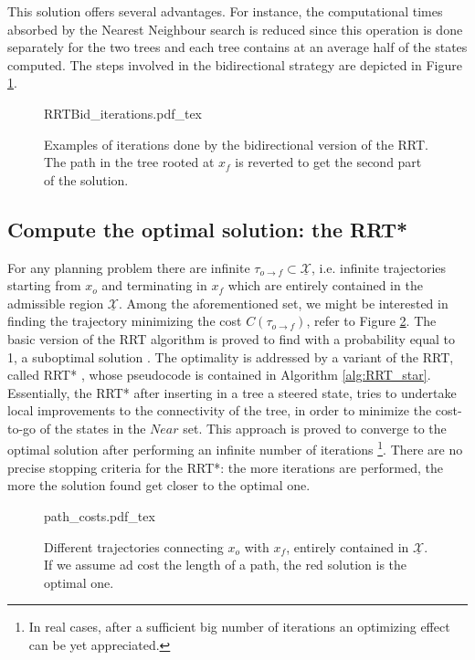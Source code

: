  This solution offers several advantages. For instance, the computational times absorbed by the Nearest Neighbour search is reduced since this operation is done separately for the two trees and each tree contains at an average half of the states computed. The steps involved in the bidirectional strategy are depicted in Figure \ref{fig:RRTBid_single}.

 \begin{figure}
	 \centering
 \def\svgwidth{0.85 \columnwidth}
 {RRTBid_iterations.pdf_tex} 
	 \caption{Examples of iterations done by the bidirectional version of the RRT. The path in the tree rooted at $x_f$ is reverted to get the second part of the solution.}
 \label{fig:RRTBid_single}
 \end{figure}
 

\subsection{Compute the optimal solution: the RRT*}
\label{sec:RRT_star}

For any planning problem there are infinite $\tau_{o \rightarrow f} \subset \underline{ \mathcal{X} }$, i.e. infinite trajectories starting from $x_o$ and terminating in $x_f$ which are entirely contained in the admissible region $\underline{ \mathcal{X} }$. Among the aforementioned set, we might be interested in finding the trajectory minimizing the cost $C(\tau_{o \rightarrow f})$, refer to Figure \ref{fig:path_costs}.
The basic version of the RRT algorithm is proved to find with a probability equal to 1, a suboptimal solution \cite{RRT_star}.
The optimality is addressed by a variant of the RRT, called RRT* \cite{RRT_star}, whose pseudocode is contained in Algorithm \ref{alg:RRT_star}.
Essentially, the RRT* after inserting in a tree a steered state, tries to undertake local improvements to the connectivity of the tree, in order to minimize the cost-to-go of the states in the $Near$ set. This approach is proved to converge to the optimal solution after performing an infinite number of iterations \footnote{In real cases, after a sufficient big number of iterations an optimizing effect can be yet appreciated. }. 
There are no precise stopping criteria for the RRT*: the more iterations are performed, the more the solution found get closer to the optimal one.

 \begin{figure}
	 \centering
 \def\svgwidth{0.4 \columnwidth}
 {path_costs.pdf_tex} 
	 \caption{Different trajectories connecting $x_o$ with $x_f$, entirely contained in $\underline{\mathcal{X}}$. If we assume ad cost the length of a path, the red solution is the optimal one.}
 \label{fig:path_costs}
 \end{figure}



